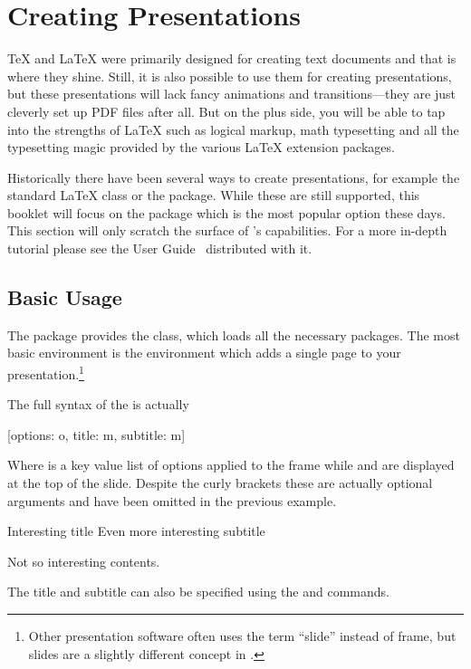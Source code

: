 \section{Creating Presentations}\label{sec:beamer}
\begingroup
{}

\TeX{} and \LaTeX{} were primarily designed for creating text documents and
that is where they shine. Still, it is also possible to use them for creating
presentations, but these presentations will lack fancy animations and
transitions---they are just cleverly set up PDF files after all. But on the
plus side, you will be able to tap into the strengths of \LaTeX{} such as
logical markup, math typesetting and all the typesetting magic provided by the
various \LaTeX{} extension packages.

Historically there have been several ways to create presentations, for example
the standard \LaTeX{}  class or the  package. While
these are still supported, this booklet will focus on the  package
which is the most popular option these days. This section will only scratch the
surface of 's capabilities. For a more in-depth tutorial please see
the User Guide~\cite{pack:beamer} distributed with it.

\subsection{Basic Usage}

The  package provides the  class, which loads all the
necessary packages. The most basic environment is the  environment
which adds a single page to your presentation.\footnote{Other presentation
  software often uses the term \enquote{slide} instead of frame, but slides are
  a slightly different concept in .}
The full syntax of the  is actually
\begin{lscommand}
  [options: o, title: m, subtitle: m]
\end{lscommand}
Where  is a key value list of options applied to the frame while
 and  are displayed at the top of the slide. Despite
the curly brackets these are actually optional arguments and have been
omitted in the previous example.
\begin{example}
\begin{frame}{%
  Interesting title}{%
  Even more interesting
  subtitle}
  
  Not so interesting contents.
\end{frame}
\end{example}
The title and subtitle can also be specified using the  and
 commands.

